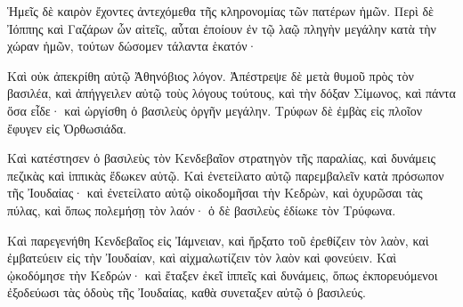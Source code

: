 {Ἡμεῖς δὲ καιρὸν ἔχοντες ἀντεχόμεθα τῆς κληρονομίας τῶν πατέρων ἡμῶν.
Περὶ δὲ Ἰόππης καὶ Γαζάρων ὧν αἰτεῖς, αὗται ἐποίουν ἐν τῷ λαῷ πληγὴν μεγάλην κατὰ τὴν χώραν ἡμῶν, τούτων δώσομεν τάλαντα ἑκατόν·
\par }{\PP {}Καὶ οὐκ ἀπεκρίθη αὐτῷ Ἀθηνόβιος λόγον. Ἀπέστρεψε δὲ μετὰ θυμοῦ πρὸς τὸν βασιλέα, καὶ ἀπήγγειλεν αὐτῷ τοὺς λόγους τούτους, καὶ τὴν δόξαν Σίμωνος, καὶ πάντα ὅσα εἶδε· καὶ ὠργίσθη ὁ βασιλεὺς ὀργῆν μεγάλην.
Τρύφων δὲ ἐμβὰς εἰς πλοῖον ἔφυγεν εἰς Ὀρθωσιάδα.
\par }{\PP {}Καὶ κατέστησεν ὁ βασιλεὺς τὸν Κενδεβαῖον στρατηγὸν τῆς παραλίας, καὶ δυνάμεις πεζικὰς καὶ ἱππικὰς ἔδωκεν αὐτῷ.
Καὶ ἐνετείλατο αὐτῷ παρεμβαλεῖν κατὰ πρόσωπον τῆς Ἰουδαίας· καὶ ἐνετείλατο αὐτῷ οἰκοδομῆσαι τὴν Κεδρὼν, καὶ ὀχυρῶσαι τὰς πύλας, καὶ ὅπως πολεμήσῃ τὸν λαόν· ὁ δὲ βασιλεὺς ἐδίωκε τὸν Τρύφωνα.
\par }{\PP {}Καὶ παρεγενήθη Κενδεβαῖος εἰς Ἰάμνειαν, καὶ ἤρξατο τοῦ ἐρεθίζειν τὸν λαὸν, καὶ ἐμβατεύειν εἰς τὴν Ἰουδαίαν, καὶ αἰχμαλωτίζειν τὸν λαὸν καὶ φονεύειν.
Καὶ ᾠκοδόμησε τὴν Κεδρών· καὶ ἔταξεν ἐκεῖ ἱππεῖς καὶ δυνάμεις, ὅπως ἐκπορευόμενοι ἐξοδεύωσι τὰς ὁδοὺς τῆς Ἰουδαίας, καθὰ συνεταξεν αὐτῷ ὁ βασιλεύς.

}
